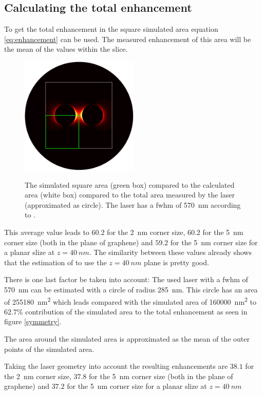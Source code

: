 \subsection{Calculating the total enhancement}

To get the total enhancement in the square simulated area equation \ref{eq:enhancement} can be used. The measured enhancement of this area will be the mean of the values within the slice.

\begin{figure}[!h]
  \centering
  \includegraphics[width=0.5\textwidth]{./images/fwhm-chart.jpg}
  \label{fig:symmetry}
  \caption{The simulated square area (green box) compared to the calculated area (white box) compared to the total area measured by the laser (approximated as circle). The laser has a fwhm of \SI{570}{nm} according to \cite{heeg}.}
\end{figure}

This average value leads to $60.2$ for the \SI{2}{nm} corner size, $60.2$ for the \SI{5}{nm} corner size (both in the plane of graphene) and $59.2$ for the \SI{5}{nm} corner size for a planar slize at $z=\SI{40}{nm}$. The similarity between these values already shows that the estimation of \cite{heeg} to use the $z=\SI{40}{nm}$ plane is pretty good.

There is one last factor be taken into account: The used laser with a fwhm of \SI{570}{nm} can be estimated with a circle of radius \SI{285}{nm}. This circle has an area of \SI{255 180}{nm^2} which leads compared with the simulated area of \SI{160 000}{nm^2} to $62.7\%$ contribution of the simulated area to the total enhancement as seen in figure \ref{symmetry}.

The area around the simulated area is approximated as the mean of the outer points of the simulated area.

Taking the laser geometry into account the resulting enhancements are $38.1$ for the \SI{2}{nm} corner size, $37.8$ for the \SI{5}{nm} corner size (both in the plane of graphene) and $37.2$ for the \SI{5}{nm} corner size for a planar slize at $z=\SI{40}{nm}$
\newpage
\null
\newpage

